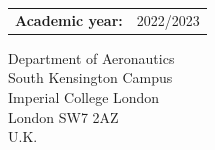 \begin{titlepage}
\begin{tabular}{rl}
\\
{\bf    Academic year:} & {2022/2023}     


  
\end{tabular}

\begin{center}

{Department of Aeronautics\\
South Kensington Campus\\
Imperial College London\\
London SW7 2AZ\\
U.K.\\}
\end{center}

\vspace{0.5cm}

\vfill %


\end{titlepage}  